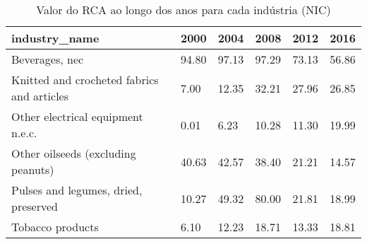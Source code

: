 \begin{table}
\centering
\caption{Valor do RCA ao longo dos anos para cada indústria (NIC)}
\begin{tabular}{p{6cm}p{1.5cm}p{1.5cm}p{1.5cm}p{1.5cm}p{1.5cm}}
\toprule
                             industry\_name &  2000 &  2004 &  2008 &  2012 &  2016 \\
\midrule
                            Beverages, nec & 94.80 & 97.13 & 97.29 & 73.13 & 56.86 \\
Knitted and crocheted fabrics and articles &  7.00 & 12.35 & 32.21 & 27.96 & 26.85 \\
         Other electrical equipment n.e.c. &  0.01 &  6.23 & 10.28 & 11.30 & 19.99 \\
        Other oilseeds (excluding peanuts) & 40.63 & 42.57 & 38.40 & 21.21 & 14.57 \\
      Pulses and legumes, dried, preserved & 10.27 & 49.32 & 80.00 & 21.81 & 18.99 \\
                          Tobacco products &  6.10 & 12.23 & 18.71 & 13.33 & 18.81 \\
\bottomrule
\end{tabular}
\end{table}
